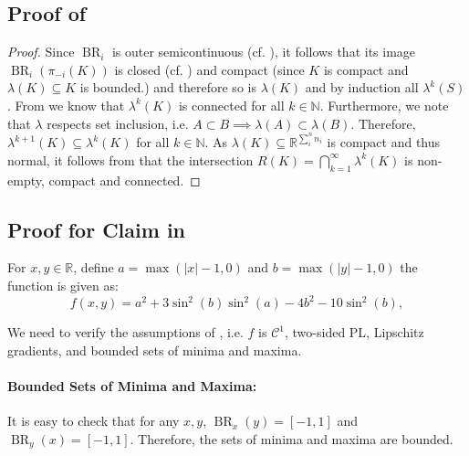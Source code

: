 \documentclass{article}
\newcommand{\R}{\mathbb{R}}
\newcommand{\N}{\mathbb{N}}
\DeclareMathOperator{\BR}{BR}
\begin{document}
\subsection{Proof of }
\label{sec:proof:connected_rationalizable}
\begin{proof}
    
   Since $\BR_i$ is outer semicontinuous (cf. ), it follows that its image $\BR_i(\pi_{-i}(K))$ is closed (cf. \citet{Dontchev2014Implicit}) and compact (since $K$ is compact and $\lambda(K) \subseteq K$ is bounded.) and therefore so is $\lambda(K)$ and by induction all $\lambda^k(S)$. From  we know that $\lambda^k(K)$ is connected for all $k\in \N$. Furthermore, we note that $\lambda$ respects set inclusion, i.e. $A \subset B \implies \lambda(A)\subset \lambda(B)$. Therefore, $\lambda^{k+1}(K)\subseteq \lambda^{k}(K)$ for all $k \in \N$. As $\lambda(K)\subseteq \R^{\sum_i^n n_i}$ is compact and thus normal, it follows from  that the intersection $R(K)=\bigcap_{k=1}^\infty \lambda^k(K)$ is non-empty, compact and connected.
\end{proof}

 




\subsection{Proof for Claim in  }
\label{sec:proof:ex:2PLfunction}
For $x,y \in \R$, define $a = \max\left(|x| - 1, 0\right)$ and $b = \max\left(|y| - 1, 0\right)$ the function is given as:
    \[
        f(x,y)= a^2 +3 \sin^2(b)\sin^2(a) - 4b^2-10\sin^2(b),
    \]

We need to verify the assumptions of , i.e. $f$ is $\mathcal{C}^1$, two-sided PL, Lipschitz gradients, and bounded sets of minima and maxima.

\paragraph{Bounded Sets of Minima and Maxima:} It is easy to check that for any $x,y$, $\BR_x(y)=[-1,1]$ and $\BR_y(x)=[-1,1]$. Therefore, the sets of minima and maxima are bounded.
\end{document}
